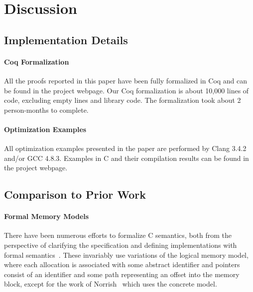 \section{Discussion}
\label{sec:intptrcast:discussion}

\subsection{Implementation Details}

\paragraph{Coq Formalization}
All the proofs reported in this paper have been fully formalized in
Coq and can be found in the project webpage.  Our Coq formalization is about 10,000 lines of code,
excluding empty lines and library code.  The formalization took about 2
person-months to complete.

\paragraph{Optimization Examples}
All optimization examples presented in the paper are performed by Clang
3.4.2 and/or GCC 4.8.3.  Examples in C and their compilation
results can be found in the project webpage.


\subsection{Comparison to Prior Work}

\paragraph{Formal Memory Models}
There have been numerous efforts to formalize C semantics, both from
the perspective of clarifying the specification and defining
implementations with formal semantics~\cite{norrish1998c,leroy:compcert,ellison2012executable,krebbers2011formalization,Greenaway:2014:DSS:2594291.2594296}. These invariably use
variations of the logical memory model, where each allocation is
associated with some abstract identifier and pointers consist of
an identifier and some path representing an offset into the memory
block, except for the work of Norrish~\cite{norrish1998c} which uses the concrete model.


